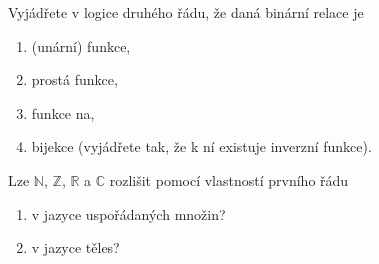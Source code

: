 \documentclass[a4paper,12pt]{article}
\begin{document}
\medskip\begin{problem} Vyjádřete v logice druhého řádu, že daná binární relace je 
\begin{enumerate}
    \item (unární) funkce,
    \item prostá funkce,
    \item funkce na,
    \item bijekce (vyjádřete tak, že k ní existuje inverzní funkce).
\end{enumerate}
\end{problem}


\medskip\begin{problem}
Lze $\mathbb N$, $\mathbb Z$, $\mathbb R$ a $\mathbb C$ rozlišit pomocí vlastností prvního řádu
\begin{enumerate}
    \item v jazyce uspořádaných množin?
    \item v jazyce těles?
\end{enumerate}
\end{problem}
\end{document}
